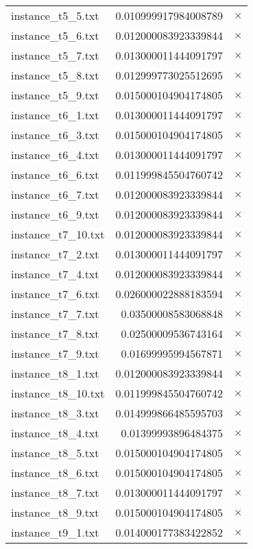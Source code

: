 \documentclass{article}
\begin{document}
\begin{center}
\begin{tabular}{|l|rr|}
instance\_t5\_5.txt & 0.010999917984008789 & $\times$ \\
instance\_t5\_6.txt & 0.012000083923339844 & $\times$ \\
instance\_t5\_7.txt & 0.013000011444091797 & $\times$ \\
instance\_t5\_8.txt & 0.012999773025512695 & $\times$ \\
instance\_t5\_9.txt & 0.015000104904174805 & $\times$ \\
instance\_t6\_1.txt & 0.013000011444091797 & $\times$ \\
instance\_t6\_3.txt & 0.015000104904174805 & $\times$ \\
instance\_t6\_4.txt & 0.013000011444091797 & $\times$ \\
instance\_t6\_6.txt & 0.011999845504760742 & $\times$ \\
instance\_t6\_7.txt & 0.012000083923339844 & $\times$ \\
instance\_t6\_9.txt & 0.012000083923339844 & $\times$ \\
instance\_t7\_10.txt & 0.012000083923339844 & $\times$ \\
instance\_t7\_2.txt & 0.013000011444091797 & $\times$ \\
instance\_t7\_4.txt & 0.012000083923339844 & $\times$ \\
instance\_t7\_6.txt & 0.026000022888183594 & $\times$ \\
instance\_t7\_7.txt & 0.03500008583068848 & $\times$ \\
instance\_t7\_8.txt & 0.02500009536743164 & $\times$ \\
instance\_t7\_9.txt & 0.01699995994567871 & $\times$ \\
instance\_t8\_1.txt & 0.012000083923339844 & $\times$ \\
instance\_t8\_10.txt & 0.011999845504760742 & $\times$ \\
instance\_t8\_3.txt & 0.014999866485595703 & $\times$ \\
instance\_t8\_4.txt & 0.01399993896484375 & $\times$ \\
instance\_t8\_5.txt & 0.015000104904174805 & $\times$ \\
instance\_t8\_6.txt & 0.015000104904174805 & $\times$ \\
instance\_t8\_7.txt & 0.013000011444091797 & $\times$ \\
instance\_t8\_9.txt & 0.015000104904174805 & $\times$ \\
instance\_t9\_1.txt & 0.014000177383422852 & $\times$ \\

\end{tabular}
\end{center}
\end{document}
